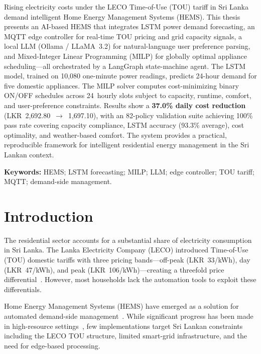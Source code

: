 \documentclass[10pt,a4paper,twocolumn]{article}
\begin{document}
Rising electricity costs under the LECO Time-of-Use (TOU) tariff in Sri Lanka demand intelligent Home Energy Management Systems (HEMS). This thesis presents an AI-based HEMS that integrates LSTM power demand forecasting, an MQTT edge controller for real-time TOU pricing and grid capacity signals, a local LLM (Ollama / LLaMA~3.2) for natural-language user preference parsing, and Mixed-Integer Linear Programming (MILP) for globally optimal appliance scheduling---all orchestrated by a LangGraph state-machine agent. The LSTM model, trained on 10,080 one-minute power readings, predicts 24-hour demand for five domestic appliances. The MILP solver computes cost-minimizing binary ON/OFF schedules across 24~hourly slots subject to capacity, runtime, comfort, and user-preference constraints. Results show a \textbf{37.0\% daily cost reduction} (LKR~2,692.80~$\rightarrow$~1,697.10), with an 82-policy validation suite achieving 100\% pass rate covering capacity compliance, LSTM accuracy (93.3\% average), cost optimality, and weather-based comfort. The system provides a practical, reproducible framework for intelligent residential energy management in the Sri Lankan context.

\noindent\textbf{Keywords:} HEMS; LSTM forecasting; MILP; LLM; edge controller; TOU tariff; MQTT; demand-side management.

\section{Introduction}

The residential sector accounts for a substantial share of electricity consumption in Sri Lanka. The Lanka Electricity Company (LECO) introduced Time-of-Use (TOU) domestic tariffs with three pricing bands---off-peak (LKR~33/kWh), day (LKR~47/kWh), and peak (LKR~106/kWh)---creating a threefold price differential~\cite{leco2024}. However, most households lack the automation tools to exploit these differentials.

Home Energy Management Systems (HEMS) have emerged as a solution for automated demand-side management~\cite{zhou2016}. While significant progress has been made in high-resource settings~\cite{beaudin2015, pipattanasomporn2012}, few implementations target Sri Lankan constraints including the LECO TOU structure, limited smart-grid infrastructure, and the need for edge-based processing.
\end{document}
